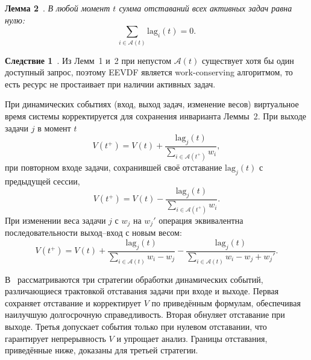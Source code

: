 \documentclass[14pt, oneside]{extbook}
\begin{document}
        \textbf{Лемма 2}~\cite{stoica}.
        \textit{В любой момент $t$ сумма отставаний всех активных
        задач равна нулю:}
        \begin{equation*}
                \sum_{i \in \mathcal{A}(t)} \mathrm{lag}_i(t) = 0.
        \end{equation*}

        \textbf{Следствие 1}~\cite{stoica}.
        Из Лемм~1 и~2 при непустом $\mathcal{A}(t)$ существует
        хотя бы один доступный запрос, поэтому EEVDF
        является work-conserving алгоритмом, то есть ресурс
        не простаивает при наличии активных задач.

        При динамических событиях (вход, выход задач,
        изменение весов) виртуальное время системы корректируется
        для сохранения инварианта Леммы~2.
        При выходе задачи $j$ в момент $t$
        \begin{equation}\label{eq:V-leave}
                V(t^+) = V(t) + \frac{\mathrm{lag}_j(t)}{\sum_{i \in
                \mathcal{A}(t^+)} w_i},
        \end{equation}
        при повторном входе задачи, сохранившей своё отставание
        $\mathrm{lag}_j(t)$ с предыдущей сессии,
        \begin{equation}\label{eq:V-rejoin}
                V(t^+) = V(t) - \frac{\mathrm{lag}_j(t)}{\sum_{i \in
                \mathcal{A}(t^+)} w_i}.
        \end{equation}
        При изменении веса задачи $j$ с $w_j$ на $w_j'$
        операция эквивалентна последовательности выход--вход
        с новым весом:
        \begin{equation}\label{eq:V-reweight}
                V(t^+) = V(t)
                + \frac{\mathrm{lag}_j(t)}{\sum_{i \in
                \mathcal{A}(t)} w_i - w_j}
                - \frac{\mathrm{lag}_j(t)}{\sum_{i \in
                \mathcal{A}(t)} w_i - w_j + w_j'}.
        \end{equation}

        В~\cite{stoica} рассматриваются три стратегии обработки
        динамических событий, различающиеся трактовкой отставания
        задачи при входе и выходе. Первая сохраняет
        отставание и корректирует $V$ по приведённым формулам,
        обеспечивая наилучшую долгосрочную справедливость. Вторая
        обнуляет отставание при выходе. Третья допускает события
        только при нулевом отставании, что гарантирует непрерывность
        $V$ и упрощает анализ. Границы отставания, приведённые ниже,
        доказаны для третьей стратегии.
\end{document}
